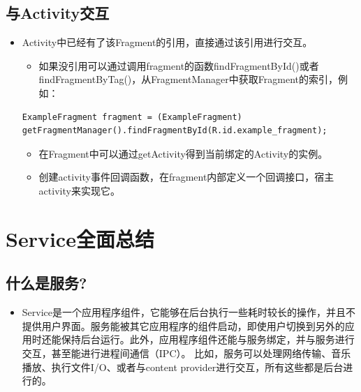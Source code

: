 \documentclass[9pt, b5paper]{article}
\begin{document}
\subsection{与Activity交互}
\label{sec-2-5}
\begin{itemize}
\item Activity中已经有了该Fragment的引用，直接通过该引用进行交互。
\begin{itemize}
\item 如果没引用可以通过调用fragment的函数findFragmentById()或者findFragmentByTag()，从FragmentManager中获取Fragment的索引，例如：
\end{itemize}
\begin{verbatim}
ExampleFragment fragment = (ExampleFragment) getFragmentManager().findFragmentById(R.id.example_fragment);
\end{verbatim}
\begin{itemize}
\item 在Fragment中可以通过getActivity得到当前绑定的Activity的实例。
\item 创建activity事件回调函数，在fragment内部定义一个回调接口，宿主activity来实现它。
\end{itemize}
\end{itemize}

\section{Service全面总结}
\label{sec-3}
\subsection{什么是服务?　　}
\label{sec-3-1}
\begin{itemize}
\item Service是一个应用程序组件，它能够在后台执行一些耗时较长的操作，并且不提供用户界面。服务能被其它应用程序的组件启动，即使用户切换到另外的应用时还能保持后台运行。此外，应用程序组件还能与服务绑定，并与服务进行交互，甚至能进行进程间通信（IPC）。 比如，服务可以处理网络传输、音乐播放、执行文件I/O、或者与content provider进行交互，所有这些都是后台进行的。
\end{itemize}
\end{document}
